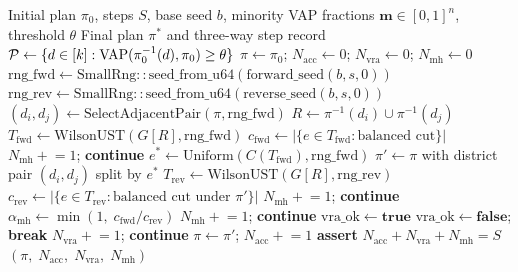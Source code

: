 \begin{algorithm}
\caption{\vr{} Chain}
\label{alg:vr}
\begin{algorithmic}[1]
\Require Initial plan $\pi_0$, steps $S$, base seed $b$, minority VAP
         fractions $\mathbf{m} \in [0,1]^n$, threshold $\theta$
\Ensure  Final plan $\pi^*$ and three-way step record
\State $\mathcal{P} \gets \{d \in [k] : \mathrm{VAP}(\pi_0^{-1}(d), \pi_0) \geq \theta\}$
\State $\pi \gets \pi_0$; \quad
       $N_{\mathrm{acc}} \gets 0$; \quad
       $N_{\mathrm{vra}} \gets 0$; \quad
       $N_{\mathrm{mh}} \gets 0$
  \State $\mathrm{rng\_fwd} \gets \mathrm{SmallRng::seed\_from\_u64}(\mathrm{forward\_seed}(b, s, 0))$
  \State $\mathrm{rng\_rev} \gets \mathrm{SmallRng::seed\_from\_u64}(\mathrm{reverse\_seed}(b, s, 0))$
  \State {}
  \State $(d_i, d_j) \gets \mathrm{SelectAdjacentPair}(\pi, \mathrm{rng\_fwd})$
  \State $R \gets \pi^{-1}(d_i) \cup \pi^{-1}(d_j)$
  \State $T_{\mathrm{fwd}} \gets \mathrm{WilsonUST}(G[R], \mathrm{rng\_fwd})$
  \State $c_{\mathrm{fwd}} \gets |\{e \in T_{\mathrm{fwd}} : \text{balanced cut}\}|$
   $N_{\mathrm{mh}} \mathrel{+}= 1$; \textbf{continue} \EndIf
  \State $e^* \gets \mathrm{Uniform}(C(T_{\mathrm{fwd}}), \mathrm{rng\_fwd})$
  \State $\pi' \gets \pi$ with district pair $(d_i, d_j)$ split by $e^*$
  \State $T_{\mathrm{rev}} \gets \mathrm{WilsonUST}(G[R], \mathrm{rng\_rev})$
  \State $c_{\mathrm{rev}} \gets |\{e \in T_{\mathrm{rev}} : \text{balanced cut under } \pi'\}|$
   $N_{\mathrm{mh}} \mathrel{+}= 1$; \textbf{continue} \EndIf
  \State $\alpha_{\mathrm{mh}} \gets \min(1,\; c_{\mathrm{fwd}} / c_{\mathrm{rev}})$
  \If{$\mathrm{Uniform}([0,1)) \geq \alpha_{\mathrm{mh}}$}
    \State $N_{\mathrm{mh}} \mathrel{+}= 1$; \textbf{continue}
  \EndIf
  \State {}
  \State $\mathrm{vra\_ok} \gets \mathbf{true}$
      \State $\mathrm{vra\_ok} \gets \mathbf{false}$; \textbf{break}
    \EndIf
  \EndFor
    \State $N_{\mathrm{vra}} \mathrel{+}= 1$; \textbf{continue}
  \EndIf
  \State $\pi \gets \pi'$; \quad $N_{\mathrm{acc}} \mathrel{+}= 1$
\EndFor
\State \textbf{assert} $N_{\mathrm{acc}} + N_{\mathrm{vra}} + N_{\mathrm{mh}} = S$
\State \Return $(\pi,\; N_{\mathrm{acc}},\; N_{\mathrm{vra}},\; N_{\mathrm{mh}})$
\end{algorithmic}
\end{algorithm}

